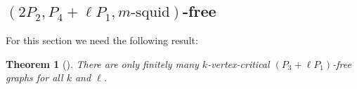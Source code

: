 \documentclass[11pt]{article}
\newtheorem{theorem}{Theorem}[section]
\newtheorem{lemma}[theorem]{Lemma}
\theoremstyle{definition}
\begin{document}
\subsection{$(2P_2,P_4+\ell P_1,m\text{-squid})$-free}

For this section we need the following result:

\begin{theorem}[\cite{AbuadasCameronHoangSawada2022}]\label{thm:P3ellP1free}
There are only finitely many $k$-vertex-critical $(P_3+\ell P_1)$-free graphs for all $k$ and $\ell$.
\end{theorem}
\end{document}
